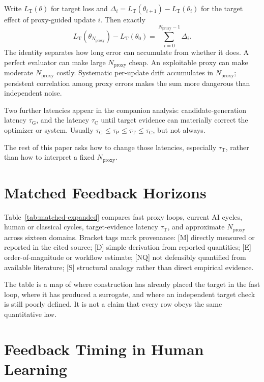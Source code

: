 \documentclass[11pt]{article}
\newcommand{\tauG}{\tau_{\mathrm{G}}}
\newcommand{\tauP}{\tau_{\mathrm{P}}}
\newcommand{\tauT}{\tau_{\mathrm{T}}}
\newcommand{\tauC}{\tau_{\mathrm{C}}}
\newcommand{\LT}{L_{\mathrm{T}}}
\newcommand{\Nproxy}{N_{\mathrm{proxy}}}
\begin{document}
Write \(\LT(\theta)\) for target loss and \(\Delta_i=\LT(\theta_{i+1})-\LT(\theta_i)\) for the target effect of proxy-guided update \(i\). Then exactly
\[
\LT(\theta_{\Nproxy})-\LT(\theta_0)=\sum_{i=0}^{\Nproxy-1}\Delta_i.
\]
The identity separates how long error can accumulate from whether it does. A perfect evaluator can make large \(\Nproxy\) cheap. An exploitable proxy can make moderate \(\Nproxy\) costly. Systematic per-update drift accumulates in \(\Nproxy\); persistent correlation among proxy errors makes the sum more dangerous than independent noise.

Two further latencies appear in the companion analysis: candidate-generation latency \(\tauG\), and the latency \(\tauC\) until target evidence can materially correct the optimizer or system. Usually \(\tauG\leq\tauP\leq\tauT\leq\tauC\), but not always.

The rest of this paper asks how to change those latencies, especially \(\tauT\), rather than how to interpret a fixed \(\Nproxy\).





\section{Matched Feedback Horizons}
\label{sec:matched-horizons}

Table~\ref{tab:matched-expanded} compares fast proxy loops, current AI cycles, human or classical cycles, target-evidence latency \(\tauT\), and approximate \(\Nproxy\) across sixteen domains. Bracket tags mark provenance: [M] directly measured or reported in the cited source; [D] simple derivation from reported quantities; [E] order-of-magnitude or workflow estimate; [NQ] not defensibly quantified from available literature; [S] structural analogy rather than direct empirical evidence.

The table is a map of where construction has already placed the target in the fast loop, where it has produced a surrogate, and where an independent target check is still poorly defined. It is not a claim that every row obeys the same quantitative law.





\section{Feedback Timing in Human Learning}
\label{sec:human-learning}
\end{document}
